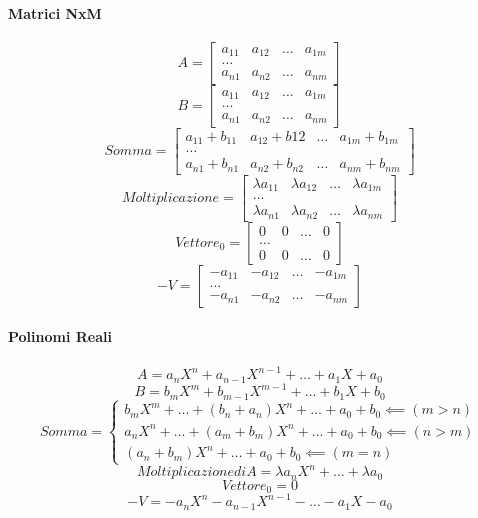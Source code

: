\documentclass[12pt,a4paper]{article}
\begin{document}
\paragraph{Matrici NxM}
\[
A = \begin{bmatrix}
  a_{11} & a_{12} & \ldots & a_{1m} \\
  \ldots\\
  a_{n1} & a_{n2} & \ldots & a_{nm}
\end{bmatrix}
\]
\[
B = \begin{bmatrix}
  a_{11} & a_{12} & \ldots & a_{1m} \\
  \ldots\\
  a_{n1} & a_{n2} & \ldots & a_{nm}
\end{bmatrix}
\]
\[
Somma = \begin{bmatrix}
  a_{11} + b_{11} & a_{12} + b{12} & \ldots & a_{1m} + b_{1m} \\
  \ldots\\
  a_{n1} + b_{n1} & a_{n2} + b_{n2} & \ldots & a_{nm} + b_{nm}
\end{bmatrix}
\]
\[
Moltiplicazione = \begin{bmatrix}
  \lambda a_{11} & \lambda a_{12} & \ldots & \lambda a_{1m} \\
  \ldots\\
  \lambda a_{n1} & \lambda a_{n2} & \ldots & \lambda a_{nm}
\end{bmatrix}
\]
\[
Vettore_0 = \begin{bmatrix}
  0 & 0 & \ldots & 0\\
  \ldots\\
  0 & 0 & \ldots & 0
\end{bmatrix}
\]
\[
-V = \begin{bmatrix}
  -a_{11} & -a_{12} & \ldots & -a_{1m} \\
  \ldots\\
  -a_{n1} & -a_{n2} & \ldots & -a_{nm}
\end{bmatrix}
\]
\paragraph{Polinomi Reali}
\[
A = a_nX^n + a_{n-1}X^{n-1} + \ldots + a_1X + a_0
\]
\[
B = b_mX^m + b_{m-1}X^{m-1} + \ldots + b_1X + b_0
\]
\[
Somma = \begin{cases}
  b_mX^m + \ldots + (b_n + a_n)X^n + \ldots + a_0 + b_0 \impliedby (m > n)\\
  a_nX^n + \ldots + (a_m + b_m)X^n + \ldots + a_0 + b_0 \impliedby (n > m)\\
  (a_n + b_m)X^n + \ldots + a_0 + b_0 \impliedby (m = n)
\end{cases}
\]
\[
Moltiplicazione di A = \lambda a_nX^n + \ldots + \lambda a_0
\]
\[
Vettore_0 = 0
\]
\[
-V = -a_nX^n - a_{n-1}X^{n-1} - \ldots - a_1X - a_0
\]
\end{document}
